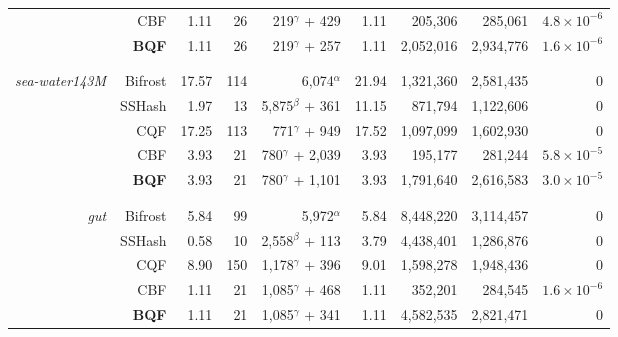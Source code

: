 \begin{table}[ht]
{\begin{tabular}{rr|rrrr|rrr}
                            & CBF               & 1.11      & 26    & 219$^\gamma$ + 429     & 1.11  & 205,306       & 285,061       & $4.8\times10^{-6}$      \\
                            & \textbf{BQF}      & 1.11      & 26    & 219$^\gamma$ + 257     & 1.11  & 2,052,016     & 2,934,776     & $1.6\times10^{-6}$      \\
    & &      &    &         &         &         &       \\ \hline
    & &      &    &         &         &         &       \\
\textit{sea-water143M}      & Bifrost       & 17.57     & 114    & 6,074$^\alpha$          &  21.94  & 1,321,360     & 2,581,435     & 0     \\
                            & SSHash        & 1.97      & 13    & 5,875$^\beta$ + 361      &  11.15  & 871,794       & 1,122,606     & 0      \\
                            & {CQF}         & 17.25     & 113   & 771$^\gamma$ + 949       &  17.52  & 1,097,099     & 1,602,930     & 0     \\
                            & CBF           & 3.93      & 21    & 780$^\gamma$ + 2,039     &  3.93   & 195,177       & 281,244       & $5.8\times10^{-5}$      \\
                            & \textbf{BQF}  & 3.93      & 21    & 780$^\gamma$ + 1,101     &  3.93   & 1,791,640     & 2,616,583     & $3.0\times10^{-5}$        \\
    & &      &    &         &         &         &       \\ \hline 
    & &      &    &         &         &         &       \\
\textit{gut}                & Bifrost           & 5.84      & 99    & 5,972$^\alpha$          &  5.84  & 8,448,220     & 3,114,457     & 0     \\
                            & SSHash            & 0.58      & 10    & 2,558$^\beta$ + 113     &  3.79  & 4,438,401     & 1,286,876     & 0      \\
                            & {CQF}             & 8.90      & 150   & 1,178$^\gamma$ + 396    &  9.01  & 1,598,278     & 1,948,436     & 0     \\
                            & CBF               & 1.11      & 21    & 1,085$^\gamma$ + 468    &  1.11  & 352,201       & 284,545       & $1.6\times10^{-6}$      \\
                            & \textbf{BQF}      & 1.11      & 21    & 1,085$^\gamma$ + 341    &  1.11  & 4,582,535     & 2,821,471     & 0     \\

\end{tabular}}
\end{table}
